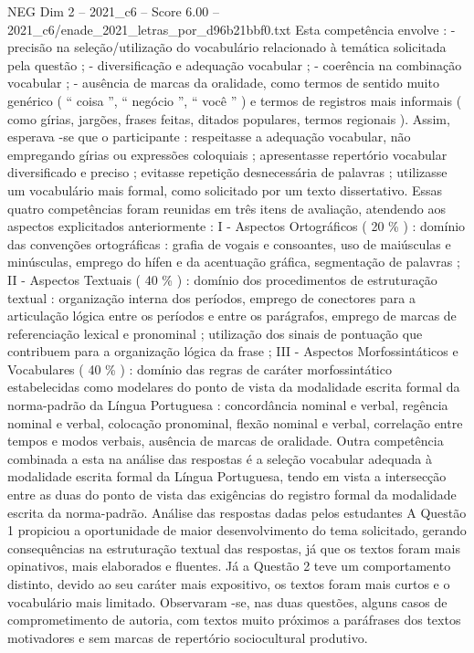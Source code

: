 \begin{textsample}{NEG Dim 2 – 2021\_c6 – Score 6.00 – 2021\_c6/enade\_2021\_letras\_por\_d96b21bbf0.txt}
Esta competência envolve : - precisão na seleção/utilização do vocabulário relacionado à temática solicitada pela questão ; - diversificação e adequação vocabular ; - coerência na combinação vocabular ; - ausência de marcas da oralidade, como termos de sentido muito genérico ( “ coisa ”, “ negócio ”, “ você ” ) e termos de registros mais informais ( como gírias, jargões, frases feitas, ditados populares, termos regionais ).
Assim, esperava -se que o participante : respeitasse a adequação vocabular, não empregando gírias ou expressões coloquiais ; apresentasse repertório vocabular diversificado e preciso ; evitasse repetição desnecessária de palavras ; utilizasse um vocabulário mais formal, como solicitado por um texto dissertativo.
Essas quatro competências foram reunidas em três itens de avaliação, atendendo aos aspectos explicitados anteriormente : I - Aspectos Ortográficos ( 20 \% ) : domínio das convenções ortográficas : grafia de vogais e consoantes, uso de maiúsculas e minúsculas, emprego do hífen e da acentuação gráfica, segmentação de palavras ; II - Aspectos Textuais ( 40 \% ) : domínio dos procedimentos de estruturação textual : organização interna dos períodos, emprego de conectores para a articulação lógica entre os períodos e entre os parágrafos, emprego de marcas de referenciação lexical e pronominal ; utilização dos sinais de pontuação que contribuem para a organização lógica da frase ; III - Aspectos Morfossintáticos e Vocabulares ( 40 \% ) : domínio das regras de caráter morfossintático estabelecidas como modelares do ponto de vista da modalidade escrita formal da norma-padrão da Língua Portuguesa : concordância nominal e verbal, regência nominal e verbal, colocação pronominal, flexão nominal e verbal, correlação entre tempos e modos verbais, ausência de marcas de oralidade.
Outra competência combinada a esta na análise das respostas é a seleção vocabular adequada à modalidade escrita formal da Língua Portuguesa, tendo em vista a intersecção entre as duas do ponto de vista das exigências do registro formal da modalidade escrita da norma-padrão.
Análise das respostas dadas pelos estudantes A Questão 1 propiciou a oportunidade de maior desenvolvimento do tema solicitado, gerando consequências na estruturação textual das respostas, já que os textos foram mais opinativos, mais elaborados e fluentes.
Já a Questão 2 teve um comportamento distinto, devido ao seu caráter mais expositivo, os textos foram mais curtos e o vocabulário mais limitado.
Observaram -se, nas duas questões, alguns casos de comprometimento de autoria, com textos muito próximos a paráfrases dos textos motivadores e sem marcas de repertório sociocultural produtivo.

\end{textsample}
